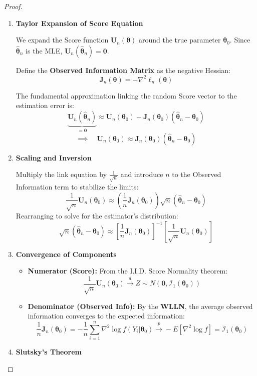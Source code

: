 \documentclass[
  letterpaper,
  DIV=11,
  numbers=noendperiod]{scrreprt}
\renewcommand{\[}{\begin{equation}}
\renewcommand{\]}{\end{equation}}
\theoremstyle{definition}
\theoremstyle{plain}
\theoremstyle{plain}
\theoremstyle{plain}
\theoremstyle{definition}
\theoremstyle{plain}
\theoremstyle{remark}
\begin{document}
\begin{proof}
\leavevmode

\begin{enumerate}
\def\labelenumi{\arabic{enumi}.}
\item
  \textbf{Taylor Expansion of Score Equation}

  We expand the Score function \(\mathbf{U}_n(\boldsymbol{\theta})\)
  around the true parameter \(\boldsymbol{\theta}_0\). Since
  \(\hat{\boldsymbol{\theta}}_n\) is the MLE,
  \(\mathbf{U}_n(\hat{\boldsymbol{\theta}}_n) = \mathbf{0}\).

  Define the \textbf{Observed Information Matrix} as the negative
  Hessian: \[
  \mathbf{J}_n(\boldsymbol{\theta}) = -\nabla^2 \ell_n(\boldsymbol{\theta})
  \]

  The fundamental approximation linking the random Score vector to the
  estimation error is: \[
  \underbrace{\mathbf{U}_n(\hat{\boldsymbol{\theta}}_n)}_{=\mathbf{0}} \approx \mathbf{U}_n(\boldsymbol{\theta}_0) - \mathbf{J}_n(\boldsymbol{\theta}_0) (\hat{\boldsymbol{\theta}}_n - \boldsymbol{\theta}_0)
  \] \[
  \implies \quad \mathbf{U}_n(\boldsymbol{\theta}_0) \approx \mathbf{J}_n(\boldsymbol{\theta}_0) (\hat{\boldsymbol{\theta}}_n - \boldsymbol{\theta}_0)
  \]
\item
  \textbf{Scaling and Inversion}

  Multiply the link equation by \(\frac{1}{\sqrt{n}}\) and introduce
  \(n\) to the Observed Information term to stabilize the limits: \[
  \frac{1}{\sqrt{n}} \mathbf{U}_n(\boldsymbol{\theta}_0) \approx \left( \frac{1}{n} \mathbf{J}_n(\boldsymbol{\theta}_0) \right) \sqrt{n}(\hat{\boldsymbol{\theta}}_n - \boldsymbol{\theta}_0)
  \] Rearranging to solve for the estimator's distribution: \[
  \sqrt{n}(\hat{\boldsymbol{\theta}}_n - \boldsymbol{\theta}_0) \approx \left[ \frac{1}{n} \mathbf{J}_n(\boldsymbol{\theta}_0) \right]^{-1} \left[ \frac{1}{\sqrt{n}} \mathbf{U}_n(\boldsymbol{\theta}_0) \right]
  \]
\item
  \textbf{Convergence of Components}

  \begin{itemize}
  \item
    \textbf{Numerator (Score):} From the I.I.D. Score Normality theorem:
    \[
      \frac{1}{\sqrt{n}} \mathbf{U}_n(\boldsymbol{\theta}_0) \xrightarrow{d} Z \sim N(\mathbf{0}, \mathcal{I}_1(\boldsymbol{\theta}_0))
      \]
  \item
    \textbf{Denominator (Observed Info):} By the \textbf{WLLN}, the
    average observed information converges to the expected information:
    \[
      \frac{1}{n} \mathbf{J}_n(\boldsymbol{\theta}_0) = -\frac{1}{n} \sum_{i=1}^n \nabla^2 \log f(Y_i|\boldsymbol{\theta}_0) \xrightarrow{p} -E[\nabla^2 \log f] = \mathcal{I}_1(\boldsymbol{\theta}_0)
      \]
  \end{itemize}
\item
  \textbf{Slutsky's Theorem}


\end{enumerate}
\end{proof}
\end{document}

